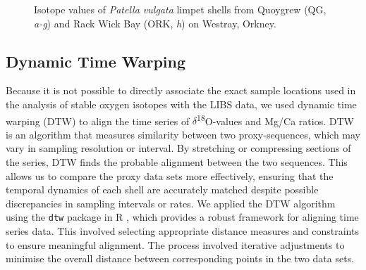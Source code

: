 \documentclass[
  authoryear,
  preprint,
  3p]{elsarticle}
\begin{document}
\begin{figure}[H]


\caption{\label{fig-Pat_iso}Isotope values of \emph{Patella vulgata}
limpet shells from Quoygrew (QG, \emph{a-g}) and Rack Wick Bay (ORK,
\emph{h}) on Westray, Orkney.}

\end{figure}%

\subsection{Dynamic Time Warping}\label{dynamic-time-warping}

Because it is not possible to directly associate the exact sample
locations used in the analysis of stable oxygen isotopes with the LIBS
data, we used dynamic time warping (DTW) to align the time series of
\(\delta\)\textsuperscript{18}O-values and Mg/Ca ratios. DTW is an
algorithm that measures similarity between two proxy-sequences, which
may vary in sampling resolution or interval. By stretching or
compressing sections of the series, DTW finds the probable alignment
between the two sequences. This allows us to compare the proxy data sets
more effectively, ensuring that the temporal dynamics of each shell are
accurately matched despite possible discrepancies in sampling intervals
or rates. We applied the DTW algorithm using the \texttt{dtw} package in
R \citep{Giorgino2009-sj, R_Core_Team2020-mk}, which provides a robust
framework for aligning time series data. This involved selecting
appropriate distance measures and constraints to ensure meaningful
alignment. The process involved iterative adjustments to minimise the
overall distance between corresponding points in the two data sets.
\end{document}
